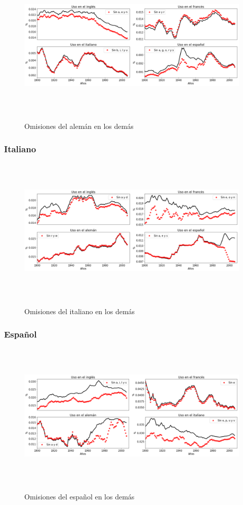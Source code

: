 \begin{figure}[h!]
	\centering
	\includegraphics[width=14.5cm, height=7cm]{Cap_5/OM_GE.png}
	\label{fig.OM_GE}
	\caption{Omisiones del alemán en los demás}
\end{figure}

\newpage
\subsubsection*{Italiano}

\begin{figure}[h!]
	\centering
	\includegraphics[width=14.5cm, height=7cm]{Cap_5/OM_IT.png}
	\label{fig.OM_IT}
	\caption{Omisiones del italiano en los demás}
\end{figure}


\subsubsection*{Español}

\begin{figure}[h!]
	\centering
	\includegraphics[width=14cm, height=7cm]{Cap_5/OM_SP.png}
	\label{fig.OM_SP}
	\caption{Omisiones del español en los demás}
\end{figure}
